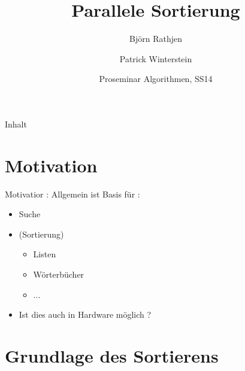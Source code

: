 \documentclass[ucs,9pt]{beamer}
\title[Para Sort] %
{Parallele Sortierung}
\author[] %
{Björn Rathjen \and Patrick Winterstein}
\institute[FU Berlin] %
{Freie Universität Berlin}
\date[ProSem Algo]
{Proseminar Algorithmen, SS14}
\begin{document}
\begin{frame}[plain]
  \titlepage
\end{frame}
 
\begin{frame}{Inhalt}
\end{frame}

\section{Motivation}
    
\begin{frame}{Motivatior : Allgemein}
    ist Basis für :
    \begin{itemize}
        \item Suche
        \item (Sortierung)
        \begin{itemize}
            \item Listen
            \item Wörterbücher
            \item ... 
        \end{itemize}
        \item Ist dies auch in Hardware möglich ?
    \end{itemize}
\end{frame}

\section{Grundlage des Sortierens}
\end{document}
